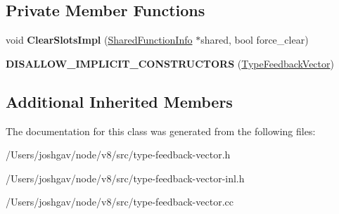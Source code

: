 \subsection*{Private Member Functions}
\begin{DoxyCompactItemize}
\item 
void {\bfseries Clear\+Slots\+Impl} (\hyperlink{classv8_1_1internal_1_1_shared_function_info}{Shared\+Function\+Info} $\ast$shared, bool force\+\_\+clear)\hypertarget{classv8_1_1internal_1_1_type_feedback_vector_abb7e1410103273952be783a1d7153085}{}\label{classv8_1_1internal_1_1_type_feedback_vector_abb7e1410103273952be783a1d7153085}

\item 
{\bfseries D\+I\+S\+A\+L\+L\+O\+W\+\_\+\+I\+M\+P\+L\+I\+C\+I\+T\+\_\+\+C\+O\+N\+S\+T\+R\+U\+C\+T\+O\+RS} (\hyperlink{classv8_1_1internal_1_1_type_feedback_vector}{Type\+Feedback\+Vector})\hypertarget{classv8_1_1internal_1_1_type_feedback_vector_aacb3a7e2545c3b6d868033a9b409c28e}{}\label{classv8_1_1internal_1_1_type_feedback_vector_aacb3a7e2545c3b6d868033a9b409c28e}

\end{DoxyCompactItemize}
\subsection*{Additional Inherited Members}


The documentation for this class was generated from the following files\+:\begin{DoxyCompactItemize}
\item 
/\+Users/joshgav/node/v8/src/type-\/feedback-\/vector.\+h\item 
/\+Users/joshgav/node/v8/src/type-\/feedback-\/vector-\/inl.\+h\item 
/\+Users/joshgav/node/v8/src/type-\/feedback-\/vector.\+cc\end{DoxyCompactItemize}

